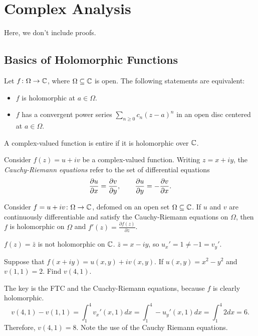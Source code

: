 \section{Complex Analysis}

Here, we don't include proofs.

\subsection{Basics of Holomorphic Functions}

\begin{theorem}
    Let $f \colon \Omega \rightarrow \mathbb{C}$, where $\Omega \subseteq \mathbb{C}$ is open.
    The following statements are equivalent:
    \begin{itemize}
        \item $f$ is holomorphic at $a \in \Omega$.
        \item $f$ has a convergent power series $\sum_{n \geq 0} c_n(z - a)^n$ in an open 
            disc centered at $a \in \Omega$.
    \end{itemize}
\end{theorem}

\begin{df}
    A complex-valued function is entire if it is holomorphic over $\mathbb{C}$.
\end{df}

\begin{df}
    Consider $f(z) = u + iv$ be a complex-valued function. Writing $z = x + iy$, the 
    \emph{Cauchy-Riemann equations} refer to the set of differential equations
    \[
    \frac{\partial u}{\partial x} = \frac{\partial v}{\partial y}, \qquad \frac{\partial u}{\partial y} = -\frac{\partial v}{\partial x}.
    \]
\end{df}

\begin{theorem}
    Consider $f = u + iv \colon \Omega \rightarrow \mathbb{C}$, defomed on an open set $\Omega \subseteq \mathbb{C}$.
    If $u$ and $v$ are continuously differentiable and satisfy the Cauchy-Riemann equations on $\Omega$,
    then $f$ is holomorphic on $\Omega$ and $f'(z) = \frac{\partial f(z)}{\partial z}$.
\end{theorem}

\begin{example}
    $f(z) = \bar{z}$ is not holomorphic on $\mathbb{C}$. $\bar{z} = x - iy$, 
    so $u_x' = 1 \neq -1 = v_y'$.
\end{example}

\begin{exercise}
Suppose that $f(x + iy) = u(x, y) + iv(x, y)$. If $u(x, y) = x^2 - y^2$ and $v(1,1) = 2$. Find $v(4,1)$.
\end{exercise}
\begin{solution}
The key is the FTC and the Cuachy-Riemann equations, because $f$ is clearly holomorphic.
\[
v(4,1) - v(1,1) = \int_1^4 v_x'(x,1) dx = \int_1^4 - u_y'(x,1) dx = \int_1^4 2dx = 6.
\]
Therefore, $v(4,1) = 8$. Note the use of the Cauchy Riemann equations.
\end{solution}

